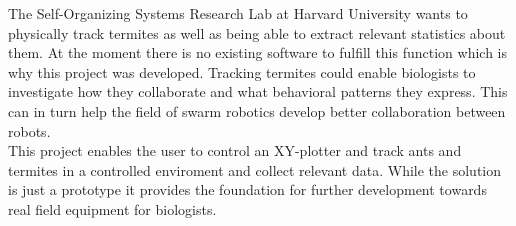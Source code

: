 


The Self-Organizing Systems Research Lab at Harvard University wants to physically track termites as well as being able to extract relevant statistics about them. At the moment there is no existing software to fulfill this function which is why this project was developed. Tracking termites could enable biologists to investigate how they collaborate and what behavioral patterns they express. This can in turn help the field of swarm robotics develop better collaboration between robots. \\

This project enables the user to control an XY-plotter and track ants and termites in a controlled enviroment and collect relevant data. While the solution is just a prototype it provides the foundation for further development towards real field equipment for biologists. 